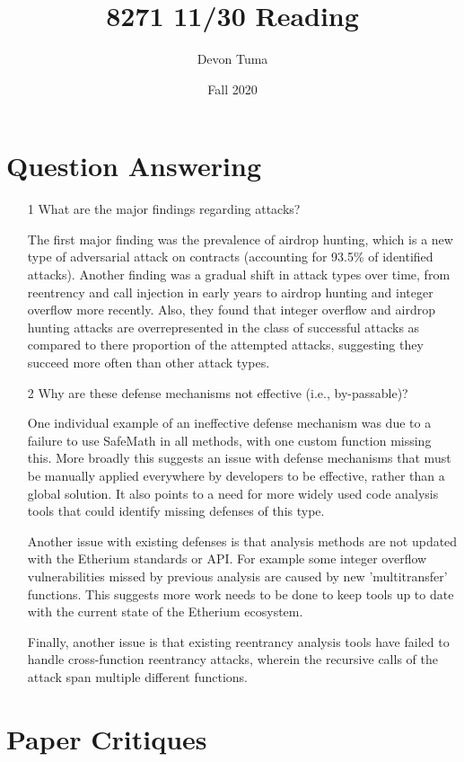 \documentclass[11pt]{article}
\title{8271 11/30 Reading}
\author{Devon Tuma}
\date{Fall 2020}
\begin{document}
\maketitle

\section*{Question Answering}

\begin{itemize}
\item [1] What are the major findings regarding attacks?

  The first major finding was the prevalence of airdrop hunting, which is a new type of adversarial attack on contracts (accounting for 93.5\% of identified attacks).
  Another finding was a gradual shift in attack types over time, from reentrency and call injection in early years to airdrop hunting and integer overflow more recently.
  Also, they found that integer overflow and airdrop hunting attacks are overrepresented in the class of successful attacks as compared to there proportion of the attempted attacks, suggesting they succeed more often than other attack types.
  
  
\item [2] Why are these defense mechanisms not effective (i.e., by-passable)?

  One individual example of an ineffective defense mechanism was due to a failure to use SafeMath in all methods, with one custom function missing this.
  More broadly this suggests an issue with defense mechanisms that must be manually applied everywhere by developers to be effective, rather than a global solution.
  It also points to a need for more widely used code analysis tools that could identify missing defenses of this type.

  Another issue with existing defenses is that analysis methods are not updated with the Etherium standards or API.
  For example some integer overflow vulnerabilities missed by previous analysis are caused by new 'multitransfer' functions.
  This suggests more work needs to be done to keep tools up to date with the current state of the Etherium ecosystem.

  Finally, another issue is that existing reentrancy analysis tools have failed to handle cross-function reentrancy attacks, wherein the recursive calls of the attack span multiple different functions.  
\end{itemize}

\section*{Paper Critiques}
\end{document}
